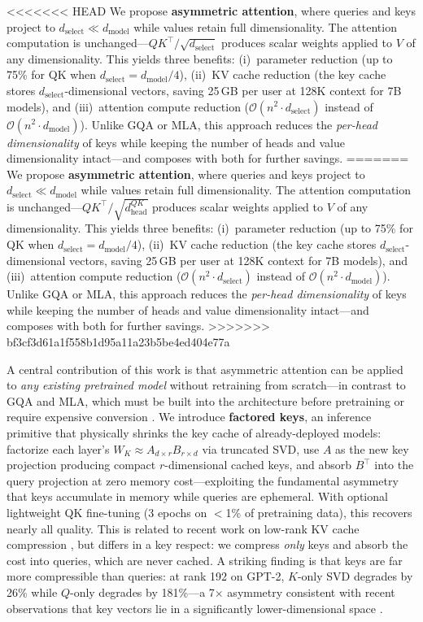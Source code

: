 \documentclass[11pt]{article}
\newcommand{\dmodel}{d_{\text{model}}}
\newcommand{\dselect}{d_{\text{select}}}
\newcommand{\BigO}{\mathcal{O}}
\begin{document}
<<<<<<< HEAD
We propose \textbf{asymmetric attention}, where queries and keys project to $\dselect \ll \dmodel$ while values retain full dimensionality. The attention computation is unchanged---$QK^\top / \sqrt{\dselect}$ produces scalar weights applied to $V$ of any dimensionality. This yields three benefits: (i)~parameter reduction (up to 75\% for QK when $\dselect = \dmodel/4$), (ii)~KV cache reduction (the key cache stores $\dselect$-dimensional vectors, saving 25\,GB per user at 128K context for 7B models), and (iii)~attention compute reduction ($\BigO(n^2 \cdot \dselect)$ instead of $\BigO(n^2 \cdot \dmodel)$). Unlike GQA or MLA, this approach reduces the \emph{per-head dimensionality} of keys while keeping the number of heads and value dimensionality intact---and composes with both for further savings.
=======
We propose \textbf{asymmetric attention}, where queries and keys project to $\dselect \ll \dmodel$ while values retain full dimensionality. The attention computation is unchanged---$QK^\top / \sqrt{d_{\text{head}}^{QK}}$ produces scalar weights applied to $V$ of any dimensionality. This yields three benefits: (i)~parameter reduction (up to 75\% for QK when $\dselect = \dmodel/4$), (ii)~KV cache reduction (the key cache stores $\dselect$-dimensional vectors, saving 25\,GB per user at 128K context for 7B models), and (iii)~attention compute reduction ($\BigO(n^2 \cdot \dselect)$ instead of $\BigO(n^2 \cdot \dmodel)$). Unlike GQA or MLA, this approach reduces the \emph{per-head dimensionality} of keys while keeping the number of heads and value dimensionality intact---and composes with both for further savings.
>>>>>>> bf3cf3d61a1f558b1d95a11a23b5be4ed404e77a

A central contribution of this work is that asymmetric attention can be applied to \emph{any existing pretrained model} without retraining from scratch---in contrast to GQA and MLA, which must be built into the architecture before pretraining or require expensive conversion \citep{mha2mla2025}. We introduce \textbf{factored keys}, an inference primitive that physically shrinks the key cache of already-deployed models: factorize each layer's $W_K \approx A_{d \times r} B_{r \times d}$ via truncated SVD, use $A$ as the new key projection producing compact $r$-dimensional cached keys, and absorb $B^\top$ into the query projection at zero memory cost---exploiting the fundamental asymmetry that keys accumulate in memory while queries are ephemeral. With optional lightweight QK fine-tuning (3 epochs on $<$1\% of pretraining data), this recovers nearly all quality. This is related to recent work on low-rank KV cache compression \citep{lrqk2025, svdllm2025, loki2024}, but differs in a key respect: we compress \emph{only} keys and absorb the cost into queries, which are never cached. A striking finding is that keys are far more compressible than queries: at rank 192 on GPT-2, $K$-only SVD degrades by 26\% while $Q$-only degrades by 181\%---a 7$\times$ asymmetry consistent with recent observations that key vectors lie in a significantly lower-dimensional space \citep{loki2024}.
\end{document}
